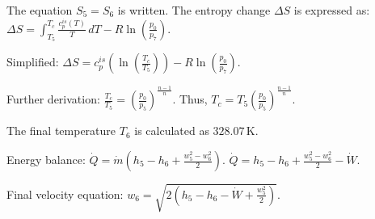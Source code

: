 The equation \( S_5 = S_6 \) is written.  
The entropy change \( \Delta S \) is expressed as:  
\( \Delta S = \int_{T_5}^{T_c} \frac{c_p^{is}(T)}{T} \, dT - R \ln \left( \frac{p_0}{p_7} \right) \).  

Simplified:  
\( \Delta S = c_p^{is} \left( \ln \left( \frac{T_c}{T_5} \right) \right) - R \ln \left( \frac{p_0}{p_7} \right) \).  

Further derivation:  
\( \frac{T_c}{T_5} = \left( \frac{p_0}{p_5} \right)^{\frac{n-1}{n}} \).  
Thus, \( T_c = T_5 \left( \frac{p_0}{p_5} \right)^{\frac{n-1}{n}} \).  

The final temperature \( T_6 \) is calculated as \( 328.07 \, \text{K} \).  

Energy balance:  
\( \dot{Q} = \dot{m} \left( h_5 - h_6 + \frac{w_5^2 - w_6^2}{2} \right) \).  
\( \dot{Q} = h_5 - h_6 + \frac{w_5^2 - w_6^2}{2} - \dot{W} \).  

Final velocity equation:  
\( w_6 = \sqrt{2 \left( h_5 - h_6 - \dot{W} + \frac{w_5^2}{2} \right)} \).